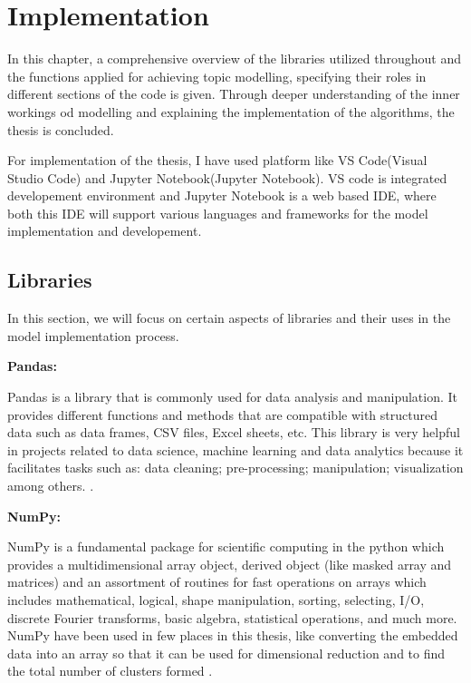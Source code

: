 \chapter{Implementation}

\label{Chapter4}


In this chapter, a comprehensive overview of the libraries utilized throughout and the functions applied for 
achieving topic modelling, specifying their roles in different sections of the code is given. Through deeper 
understanding of the inner workings od modelling and explaining the implementation of the algorithms, the thesis is concluded.

For implementation of the thesis, I have used platform like VS Code(Visual Studio Code) and Jupyter Notebook(Jupyter Notebook).
VS code is integrated developement environment and Jupyter Notebook is a web based IDE, where both this IDE will support various 
languages and frameworks for the model implementation and developement.

\section{Libraries}

In this section, we will focus on certain aspects of libraries and their uses in the model implementation process.

\noindent\textbf{Pandas:}

Pandas is a library that is commonly used for data analysis and manipulation. It provides different functions and methods that are compatible with 
structured data such as data frames, CSV files, Excel sheets, etc. This library is very helpful in projects related to data science, 
machine learning and data analytics because it facilitates tasks such as: data cleaning; pre-processing; manipulation; visualization among others. \cite{pythonlibrary}.



\noindent\textbf{NumPy:}

NumPy is a fundamental package for scientific computing in the python which provides a multidimensional array object, 
derived object (like masked array and matrices) and an assortment of routines for fast operations on arrays which 
includes mathematical, logical, shape manipulation, sorting, selecting, I/O, discrete Fourier transforms, basic algebra,
 statistical operations, and much more. NumPy have been used in few places in this thesis, like converting the 
 embedded data into an array so that it can be used for dimensional reduction and to find
the total number of clusters formed \cite{pythonlibrary}.

